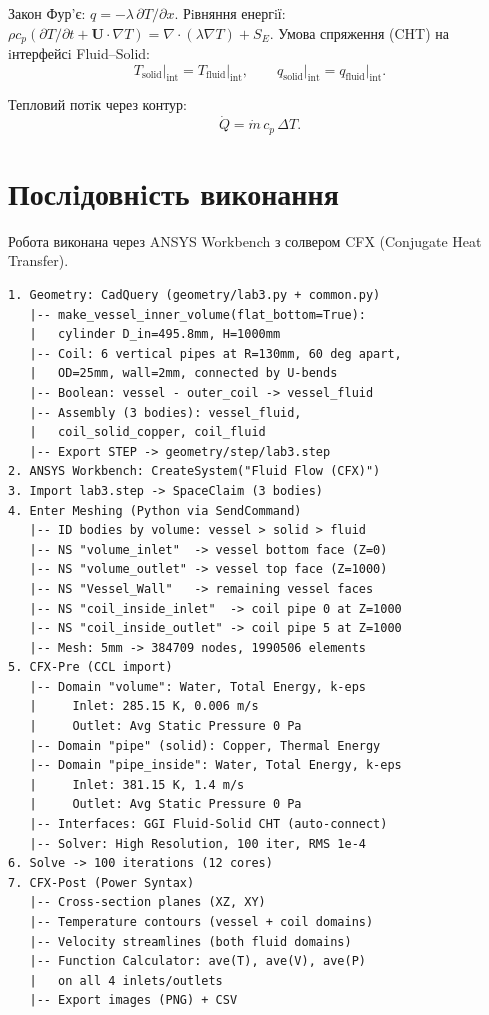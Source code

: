 Закон Фур'є: $q = -\lambda\,\partial T / \partial x$.
Рiвняння енергiї: $\rho c_p(\partial T/\partial t + \mathbf{U}\cdot\nabla T) = \nabla\cdot(\lambda\nabla T) + S_E$.
Умова спряження (CHT) на iнтерфейсi Fluid--Solid:
\begin{equation}
  T_{\mathrm{solid}}\big|_{\mathrm{int}} = T_{\mathrm{fluid}}\big|_{\mathrm{int}},
  \qquad
  q_{\mathrm{solid}}\big|_{\mathrm{int}} = q_{\mathrm{fluid}}\big|_{\mathrm{int}}.
\end{equation}

Тепловий потiк через контур:
\begin{equation}
  \dot{Q} = \dot{m}\,c_p\,\Delta T.
\end{equation}

\section{Послiдовнiсть виконання}

Робота виконана через ANSYS Workbench з солвером CFX (Conjugate Heat Transfer).

\begin{lstlisting}[style=scheme]
1. Geometry: CadQuery (geometry/lab3.py + common.py)
   |-- make_vessel_inner_volume(flat_bottom=True):
   |   cylinder D_in=495.8mm, H=1000mm
   |-- Coil: 6 vertical pipes at R=130mm, 60 deg apart,
   |   OD=25mm, wall=2mm, connected by U-bends
   |-- Boolean: vessel - outer_coil -> vessel_fluid
   |-- Assembly (3 bodies): vessel_fluid,
   |   coil_solid_copper, coil_fluid
   |-- Export STEP -> geometry/step/lab3.step
2. ANSYS Workbench: CreateSystem("Fluid Flow (CFX)")
3. Import lab3.step -> SpaceClaim (3 bodies)
4. Enter Meshing (Python via SendCommand)
   |-- ID bodies by volume: vessel > solid > fluid
   |-- NS "volume_inlet"  -> vessel bottom face (Z=0)
   |-- NS "volume_outlet" -> vessel top face (Z=1000)
   |-- NS "Vessel_Wall"   -> remaining vessel faces
   |-- NS "coil_inside_inlet"  -> coil pipe 0 at Z=1000
   |-- NS "coil_inside_outlet" -> coil pipe 5 at Z=1000
   |-- Mesh: 5mm -> 384709 nodes, 1990506 elements
5. CFX-Pre (CCL import)
   |-- Domain "volume": Water, Total Energy, k-eps
   |     Inlet: 285.15 K, 0.006 m/s
   |     Outlet: Avg Static Pressure 0 Pa
   |-- Domain "pipe" (solid): Copper, Thermal Energy
   |-- Domain "pipe_inside": Water, Total Energy, k-eps
   |     Inlet: 381.15 K, 1.4 m/s
   |     Outlet: Avg Static Pressure 0 Pa
   |-- Interfaces: GGI Fluid-Solid CHT (auto-connect)
   |-- Solver: High Resolution, 100 iter, RMS 1e-4
6. Solve -> 100 iterations (12 cores)
7. CFX-Post (Power Syntax)
   |-- Cross-section planes (XZ, XY)
   |-- Temperature contours (vessel + coil domains)
   |-- Velocity streamlines (both fluid domains)
   |-- Function Calculator: ave(T), ave(V), ave(P)
   |   on all 4 inlets/outlets
   |-- Export images (PNG) + CSV
\end{lstlisting}

